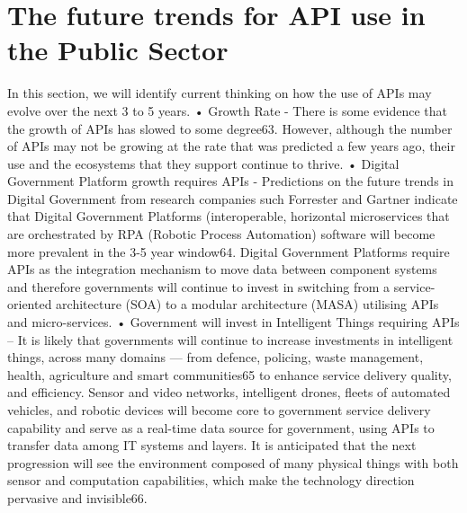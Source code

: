 \chapter{The future trends for API use in the Public Sector}

\ifpdf
    \graphicspath{{Chapter4/Figs/Raster/}{Chapter4/Figs/PDF/}{Chapter4/Figs/}}
\else
    \graphicspath{{Chapter4/Figs/Vector/}{Chapter4/Figs/}}
\fi

In this section, we will identify current thinking on how the use of APIs may evolve over the next 3 to 5
years.
• Growth Rate - There is some evidence that the growth of APIs has slowed to some degree63.
However, although the number of APIs may not be growing at the rate that was predicted a few
years ago, their use and the ecosystems that they support continue to thrive.
• Digital Government Platform growth requires APIs - Predictions on the future trends in Digital
Government from research companies such Forrester and Gartner indicate that Digital Government
Platforms (interoperable, horizontal microservices that are orchestrated by RPA (Robotic Process
Automation) software will become more prevalent in the 3-5 year window64. Digital Government
Platforms require APIs as the integration mechanism to move data between component systems
and therefore governments will continue to invest in switching from a service-oriented architecture
(SOA) to a modular architecture (MASA) utilising APIs and micro-services.
• Government will invest in Intelligent Things requiring APIs – It is likely that governments will
continue to increase investments in intelligent things, across many domains — from defence,
policing, waste management, health, agriculture and smart communities65 to enhance service
delivery quality, and efficiency. Sensor and video networks, intelligent drones, fleets of automated
vehicles, and robotic devices will become core to government service delivery capability and serve
as a real-time data source for government, using APIs to transfer data among IT systems and
layers.
It is anticipated that the next progression will see the environment composed of many physical
things with both sensor and computation capabilities, which make the technology direction
pervasive and invisible66.
